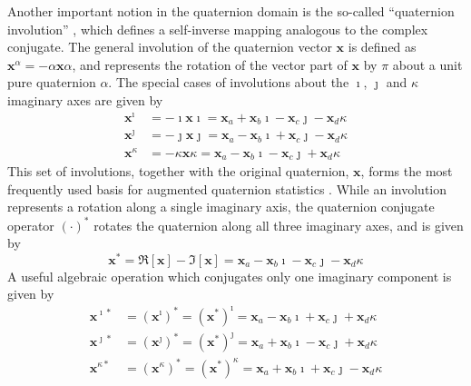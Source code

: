 \documentclass[review]{elsarticle}
\theoremstyle{plain}
\theoremstyle{remark}
\theoremstyle{plain}
\theoremstyle{definition}
\theoremstyle{prop}
\theoremstyle{definition}
\theoremstyle{plain}
\theoremstyle{plain}
\begin{document}
Another important notion in the quaternion domain is the so-called ``quaternion involution'' \cite{Ell2007}, which defines a self-inverse mapping analogous to the complex conjugate. The general involution of the quaternion vector $\mathbf{x}$ is defined as $\mathbf{x}^{\alpha}=-\alpha \mathbf{x}\alpha$, and represents the rotation of the vector part of $\mathbf{x}$ by $\pi$ about a unit pure quaternion $\alpha$. The special cases of involutions about the $\imath$, $\jmath$ and $\kappa$ imaginary axes are given by~\cite{Ell2007}
\begin{equation}
\begin{split}
\mathbf{x}^\imath &= -\imath\mathbf{x}\imath = \mathbf{x}_a + \mathbf{x}_b \imath- \mathbf{x}_c \jmath- \mathbf{x}_d \kappa\\
\mathbf{x}^\jmath &= -\jmath\mathbf{x}\jmath = \mathbf{x}_a - \mathbf{x}_b \imath+ \mathbf{x}_c \jmath- \mathbf{x}_d \kappa\\
\mathbf{x}^\kappa &= -\kappa\mathbf{x}\kappa = \mathbf{x}_a - \mathbf{x}_b \imath-\mathbf{x}_c \jmath + \mathbf{x}_d\kappa
\end{split}\label{eq: invol}
\end{equation}
This set of involutions, together with the original quaternion, $\mathbf{x}$, forms the most frequently used basis for augmented quaternion statistics \cite{CheongTook2011b,Via2010}. While an involution represents a rotation along a single imaginary axis, the quaternion conjugate operator $(\cdot)^*$ rotates the quaternion along all three imaginary axes, and is given by
\begin{equation}
\mathbf{x}^{*}=\mathfrak{R}[\mathbf{x}]-\mathfrak{I}[\mathbf{x}]= \mathbf{x}_a - \mathbf{x}_b \imath- \mathbf{x}_c \jmath- \mathbf{x}_d\kappa
\label{eq: conjugate}
\end{equation}
A useful algebraic operation which conjugates only one imaginary component is given by
\begin{equation}
\begin{split}
\mathbf{x}^{\imath*}&=(\mathbf{x}^{\imath})^*=(\mathbf{x}^{*})^\imath = \mathbf{x}_a - \mathbf{x}_b\imath + \mathbf{x}_c\jmath + \mathbf{x}_d \kappa\\
\mathbf{x}^{\jmath*}&= (\mathbf{x}^{\jmath})^*=(\mathbf{x}^{*})^\jmath = \mathbf{x}_a + \mathbf{x}_b\imath - \mathbf{x}_c\jmath + \mathbf{x}_d\kappa \\
\mathbf{x}^{\kappa*}&= (\mathbf{x}^{\kappa})^*=(\mathbf{x}^{*})^\kappa = \mathbf{x}_a + \mathbf{x}_b\imath + \mathbf{x}_c\jmath - \mathbf{x}_d\kappa
\end{split}\label{eq: invol_conj}
\end{equation}
\end{document}
